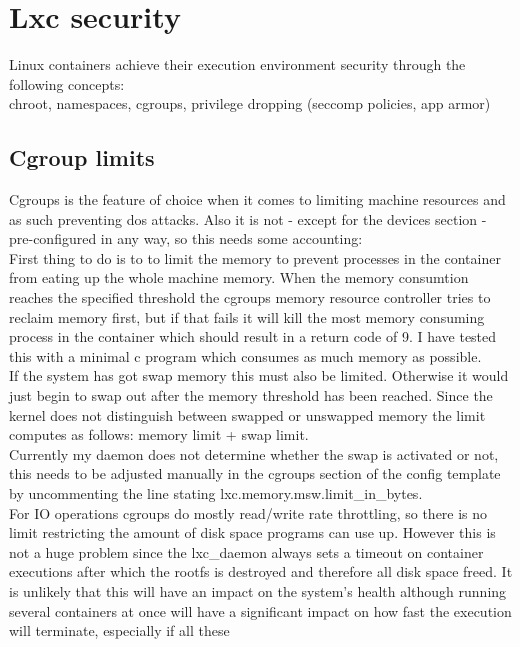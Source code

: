 \chapter{Lxc security}

Linux containers achieve their execution environment security through the following concepts:\\
chroot, namespaces, cgroups, privilege dropping (seccomp policies, app armor)\\

\section{Cgroup limits}

Cgroups is the feature of choice when it comes to limiting machine resources and as such preventing dos attacks.
Also it is not - except for the devices section - pre-configured in any way, so this needs some accounting:\\
First thing to do is to to limit the memory to prevent processes in the container from eating up the whole machine memory.
When the memory consumtion reaches the specified threshold the cgroups memory resource controller tries to reclaim memory first,
but if that fails it will kill the most memory consuming process in the container which should result in a return code of 9\cite{cgrpmem}.
I have tested this with a minimal c program which consumes as much memory as possible.\\
If the system has got swap memory this must also be limited. Otherwise it would just begin to swap out after the memory
threshold has been reached. Since the kernel does not distinguish between swapped or unswapped memory the limit computes as follows:
memory limit + swap limit.\\
Currently my daemon does not determine whether the swap is activated or not, this needs to be adjusted manually in the cgroups
section of the config template by uncommenting the line stating lxc.memory.msw.limit\_in\_bytes.\\
For IO operations cgroups do mostly read/write rate throttling, so there is no limit restricting the amount of disk space programs
can use up. However this is not a huge problem since the lxc\_daemon always sets a timeout on container executions after which the
rootfs is destroyed and therefore all disk space freed. It is unlikely that this will have an impact on the system's health although
running several containers at once will have a significant impact on how fast the execution will terminate, especially if all these

